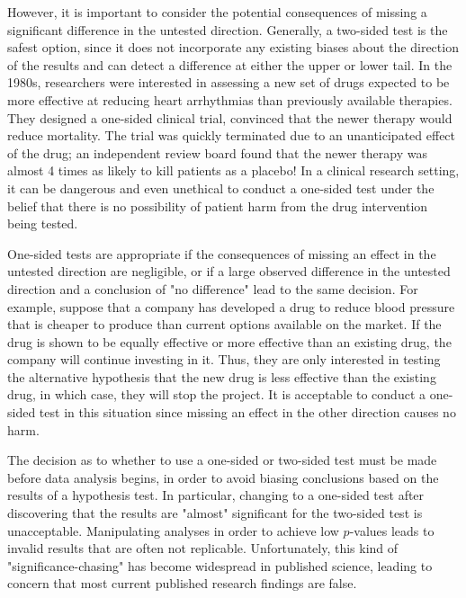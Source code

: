 However, it is important to consider the potential consequences of missing a significant difference in the untested direction. Generally, a two-sided test is the safest option, since it does not incorporate any existing biases about the direction of the results and can detect a difference at either the upper or lower tail. In the 1980s, researchers were interested in assessing a new set of drugs expected to be more effective at reducing heart arrhythmias than previously available therapies. They designed a one-sided clinical trial, convinced that the newer therapy would reduce mortality. The trial was quickly terminated due to an unanticipated effect of the drug; an independent review board found that the newer therapy was almost 4 times as likely to kill patients as a placebo! In a clinical research setting, it can be dangerous and even unethical to conduct a one-sided test under the belief that there is no possibility of patient harm from the drug intervention being tested.


One-sided tests are appropriate if the consequences of missing an effect in the untested direction are negligible, or if a large observed difference in the untested direction and a conclusion of "no difference" lead to the same decision. For example, suppose that a company has developed a drug to reduce blood pressure that is cheaper to produce than current options available on the market. If the drug is shown to be equally effective or more effective than an existing drug, the company will continue investing in it. Thus, they are only interested in testing the alternative hypothesis that the new drug is less effective than the existing drug, in which case, they will stop the project. It is acceptable to conduct a one-sided test in this situation since missing an effect in the other direction causes no harm. 

The decision as to whether to use a one-sided or two-sided test must be made before data analysis begins, in order to avoid biasing conclusions based on the results of a hypothesis test. In particular, changing to a one-sided test after discovering that the results are "almost" significant for the two-sided test is unacceptable. Manipulating analyses in order to achieve low $p$-values leads to invalid results that are often not replicable. Unfortunately, this kind of "significance-chasing" has become widespread in published science, leading to concern that most current published research findings are false.

